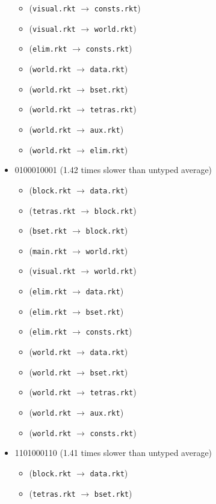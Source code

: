 \documentclass{article}
\newcommand{\mono}[1]{\texttt{#1}}
\begin{document}
\begin{itemize}
\begin{itemize}
  \item (\mono{visual.rkt} $\rightarrow$ \mono{consts.rkt})
  \item (\mono{visual.rkt} $\rightarrow$ \mono{world.rkt})
  \item (\mono{elim.rkt} $\rightarrow$ \mono{consts.rkt})
  \item (\mono{world.rkt} $\rightarrow$ \mono{data.rkt})
  \item (\mono{world.rkt} $\rightarrow$ \mono{bset.rkt})
  \item (\mono{world.rkt} $\rightarrow$ \mono{tetras.rkt})
  \item (\mono{world.rkt} $\rightarrow$ \mono{aux.rkt})
  \item (\mono{world.rkt} $\rightarrow$ \mono{elim.rkt})
  \end{itemize}
\item 0100010001 (1.42 times slower than untyped average)
  \begin{itemize}
  \item (\mono{block.rkt} $\rightarrow$ \mono{data.rkt})
  \item (\mono{tetras.rkt} $\rightarrow$ \mono{block.rkt})
  \item (\mono{bset.rkt} $\rightarrow$ \mono{block.rkt})
  \item (\mono{main.rkt} $\rightarrow$ \mono{world.rkt})
  \item (\mono{visual.rkt} $\rightarrow$ \mono{world.rkt})
  \item (\mono{elim.rkt} $\rightarrow$ \mono{data.rkt})
  \item (\mono{elim.rkt} $\rightarrow$ \mono{bset.rkt})
  \item (\mono{elim.rkt} $\rightarrow$ \mono{consts.rkt})
  \item (\mono{world.rkt} $\rightarrow$ \mono{data.rkt})
  \item (\mono{world.rkt} $\rightarrow$ \mono{bset.rkt})
  \item (\mono{world.rkt} $\rightarrow$ \mono{tetras.rkt})
  \item (\mono{world.rkt} $\rightarrow$ \mono{aux.rkt})
  \item (\mono{world.rkt} $\rightarrow$ \mono{consts.rkt})
  \end{itemize}
\item 1101000110 (1.41 times slower than untyped average)
  \begin{itemize}
  \item (\mono{block.rkt} $\rightarrow$ \mono{data.rkt})
  \item (\mono{tetras.rkt} $\rightarrow$ \mono{bset.rkt})

\end{itemize}
\end{itemize}
\end{document}
